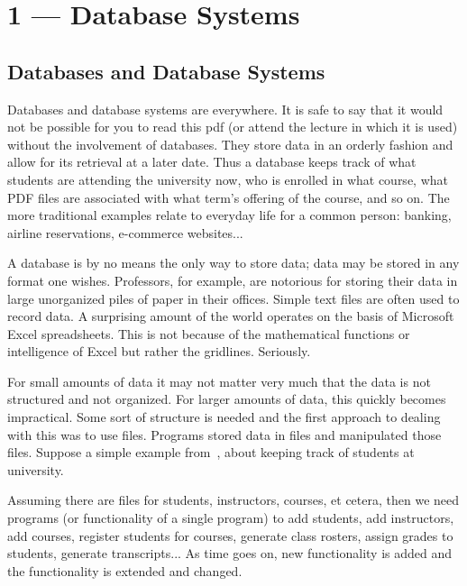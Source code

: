 \documentclass[a4paper]{report}
\begin{document}
\tableofcontents


\chapter*{1 --- Database Systems}


\section*{Databases and Database Systems}

Databases and database systems are everywhere. It is safe to say that it would not be possible for you to read this pdf (or attend the lecture in which it is used) without the involvement of databases. They store data in an orderly fashion and allow for its retrieval at a later date. Thus a database keeps track of what students are attending the university now, who is enrolled in what course, what PDF files are associated with what term's offering of the course, and so on. The more traditional examples relate to everyday life for a common person: banking, airline reservations, e-commerce websites...

A database is by no means the only way to store data; data may be stored in any format one wishes. Professors, for example, are notorious for storing their data in large unorganized piles of paper in their offices. Simple text files are often used to record data. A surprising amount of the world operates on the basis of Microsoft Excel spreadsheets. This is not because of the mathematical functions or intelligence of Excel but rather the gridlines. Seriously.

For small amounts of data it may not matter very much that the data is not structured and not organized. For larger amounts of data, this quickly becomes impractical. Some sort of structure is needed and the first approach to dealing with this was to use files. Programs stored data in files and manipulated those files. Suppose a simple example from~\cite{dsc}, about keeping track of students at university.

Assuming there are files for students, instructors, courses, et cetera, then we need programs (or functionality of a single program) to add students, add instructors, add courses, register students for courses, generate class rosters, assign grades to students, generate transcripts... As time goes on, new functionality is added and the functionality is extended and changed.
\end{document}
